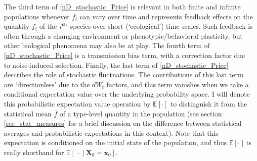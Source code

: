 The third term of \eqref{nD_stochastic_Price} is relevant in both finite and infinite populations whenever $f_i$ can vary over time and represents feedback effects on the quantity $f_i$ of the $i\textsuperscript{th}$ species over short (`ecological') time-scales. Such feedback is often through a changing environment or phenotypic/behavioral plasticity, but other biological phenomena may also be at play. The fourth term of \eqref{nD_stochastic_Price} is a transmission bias term, with a correction factor due to noise-induced selection. Finally, the last term of \eqref{nD_stochastic_Price} describes the role of stochastic fluctuations. The contributions of this last term are `directionless' due to the $dW_t$ factors, and this term vanishes when we take a conditional expectation value over the underlying probability space. I will denote this probabilistic expectation value operation by $\mathbb{E}[\cdot]$ to distinguish it from the statistical mean $\overline{f}$ of a type-level quantity in the population (see section \ref{sec_stat_measures} for a brief discussion on the difference between statistical averages and probabilistic expectations in this context). Note that this expectation is conditioned on the initial state of the population, and thus $\mathbb{E}[\cdot]$ is really shorthand for $\mathbb{E}[\ \cdot \ | \ \mathbf{X}_0 = \mathbf{x}_0]$.

